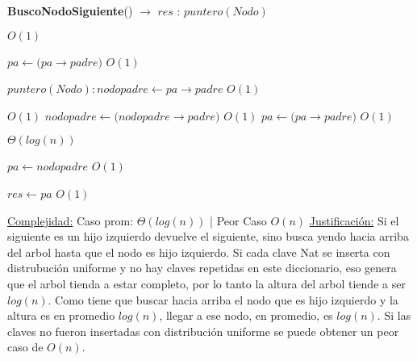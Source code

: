 \begin{algorithm}[H]{\textbf{BuscoNodoSiguiente}() $\to$ $res$ : $puntero(Nodo)$}

	\begin{algorithmic}
		 \Comment $O(1)$

			\State $pa \gets (pa$$\rightarrow$$padre)$ \Comment $O(1)$

		\Else
				\State $puntero(Nodo): nodopadre \gets pa$$\rightarrow$$padre$ \Comment $O(1)$

				 \Comment $O(1)$
					\State $nodopadre \gets (nodopadre$$\rightarrow$$padre)$ \Comment $O(1)$
					\State $pa \gets (pa$$\rightarrow$$padre)$ \Comment $O(1)$

				\EndWhile \Comment $\Theta(log(n))$

				\State $pa \gets nodopadre$ \Comment $O(1)$

		\EndIf
		
		\State $res \gets pa$ \Comment $O(1)$

		\medskip
		\Statex \underline{Complejidad:} Caso prom: $\Theta(log(n))$ | Peor Caso $O(n)$
		\Statex \underline{Justificación:} Si el siguiente es un hijo izquierdo devuelve el siguiente, sino busca yendo hacia arriba del arbol hasta que el nodo es hijo izquierdo. Si cada clave Nat se inserta con distrubución uniforme y no hay claves repetidas en este diccionario, eso genera que el arbol tienda a estar completo, por lo tanto la altura del arbol tiende a ser $log(n)$. Como tiene que buscar hacia arriba el nodo que es hijo izquierdo y la altura es en promedio $log(n)$, llegar a ese nodo, en promedio, es $log(n)$. Si las claves no fueron insertadas con distribución uniforme se puede obtener un peor caso de $O(n)$.

    \end{algorithmic}
\end{algorithm}


